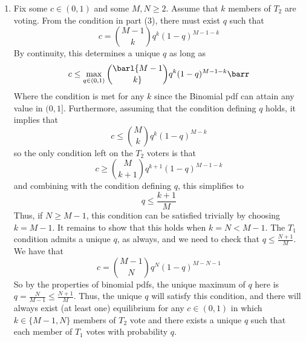 \documentclass[10pt]{article}
\begin{document}
\begin{enumerate}
	\item Fix some $c\in (0,1)$ and some $M,N \ge 2$. Assume that $k$ members of $T_2$ are voting. From the condition in part (3), there must exist $q$ such that \[c = {M-1 \choose k}q^k(1-q)^{M-1-k}\]By continuity, this determines a unique $q$ as long as \[c \le \max_{q \in (0,1)} \barl {M-1 \choose k}q^k(1-q)^{M-1-k}\barr\]Where the condition is met for any $k$ since the Binomial pdf can attain any value in $(0,1]$. Furthermore, assuming that the condition defining $q$ holds, it implies that \[c \le {M \choose k}q^k (1-q)^{M-k}\]so the only condition left on the $T_2$ voters is that \[c \ge {M \choose k+1} q^{k+1}(1-q)^{M - 1 - k}\]and combining with the condition defining $q$, this simplifies to \[q \le \frac{k+1}{M}\]Thus, if $N \ge M-1$, this condition can be satisfied trivially by choosing $k = M-1$. It remains to show that this holds when $k = N < M-1$. The $T_1$ condition admits a unique $q$, as always, and we need to check that $q \le \frac{N+1}{M}$. We have that \[c = {M-1 \choose N}q^N(1-q)^{M-N-1}\]So by the properties of binomial pdfs, the unique maximum of $q$ here is $q = \frac{N}{M-1} \le \frac{N+1}{M}$. Thus, the unique $q$ will satisfy this condition, and there will always exist (at least one) equilibrium for any $c \in (0,1)$ in which $k \in \{M-1,N\}$ members of $T_2$ vote and there exists a unique $q$ such that each member of $T_1$ votes with probability $q$.
\end{enumerate}
\end{document}
